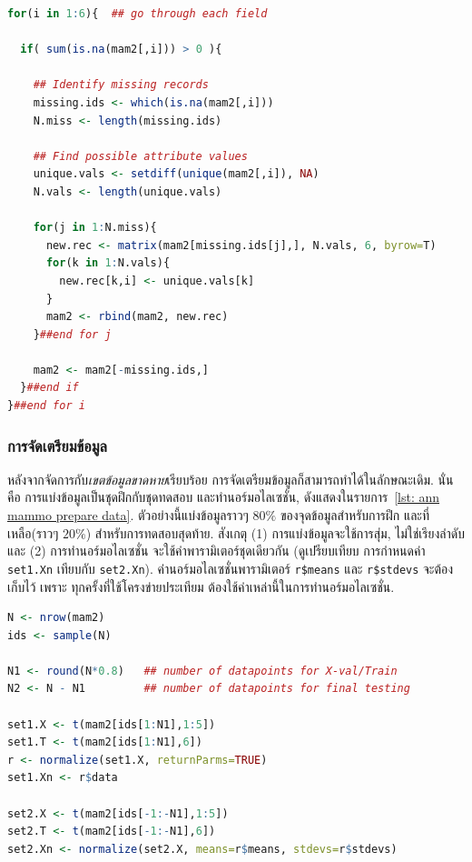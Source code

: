 \begin{lstlisting}[language=R,caption={ตัวอย่างการจัดการกับค่าบางเขตข้อมูลขาดไป ด้วยวิธีแทนทุกค่าที่เป็นไปได้},label={lst: ann mammo deal with missing values}]
for(i in 1:6){  ## go through each field

  if( sum(is.na(mam2[,i])) > 0 ){

    ## Identify missing records
    missing.ids <- which(is.na(mam2[,i]))
    N.miss <- length(missing.ids)

    ## Find possible attribute values
    unique.vals <- setdiff(unique(mam2[,i]), NA)
    N.vals <- length(unique.vals)

    for(j in 1:N.miss){
      new.rec <- matrix(mam2[missing.ids[j],], N.vals, 6, byrow=T)
      for(k in 1:N.vals){
        new.rec[k,i] <- unique.vals[k]
      }
      mam2 <- rbind(mam2, new.rec)
    }##end for j

    mam2 <- mam2[-missing.ids,]
  }##end if
}##end for i
\end{lstlisting}

\subsubsection{การจัดเตรียมข้อมูล}

หลังจากจัดการกับ\textit{เขตข้อมูลขาดหาย}เรียบร้อย 
การจัดเตรียมข้อมูลก็สามารถทำได้ในลักษณะเดิม.
นั่นคือ การแบ่งข้อมูลเป็นชุดฝึกกับชุดทดสอบ
และทำนอร์มอไลเซชั่น, ดังแสดงในรายการ~\ref{lst: ann mammo prepare data}.
ตัวอย่างนี้แบ่งข้อมูลราวๆ $80\%$ ของจุดข้อมูลสำหรับการฝึก 
และที่เหลือ(ราวๆ $20\%$) สำหรับการทดสอบสุดท้าย.
สังเกตุ (1) การแบ่งข้อมูลจะใช้การสุ่ม, ไม่ใช่เรียงลำดับ
และ (2) การทำนอร์มอไลเซชั่น จะใช้ค่าพารามิเตอร์ชุดเดียวกัน (ดูเปรียบเทียบ การกำหนดค่า \texttt{set1.Xn} เทียบกับ \texttt{set2.Xn}).
ค่านอร์มอไลเซชั่นพารามิเตอร์ \texttt{r\$means} และ \texttt{r\$stdevs} จะต้องเก็บไว้ 
เพราะ ทุกครั้งที่ใช้โครงข่ายประเทียม ต้องใช้ค่าเหล่านี้ในการทำนอร์มอไลเซชั่น.

\begin{lstlisting}[language=R,caption={ตัวอย่างการจัดเตรียมข้อมูล Mammographic Mass},label={lst: ann mammo prepare data}]
N <- nrow(mam2)
ids <- sample(N)

N1 <- round(N*0.8)   ## number of datapoints for X-val/Train
N2 <- N - N1         ## number of datapoints for final testing

set1.X <- t(mam2[ids[1:N1],1:5])
set1.T <- t(mam2[ids[1:N1],6])
r <- normalize(set1.X, returnParms=TRUE)
set1.Xn <- r$data

set2.X <- t(mam2[ids[-1:-N1],1:5])
set2.T <- t(mam2[ids[-1:-N1],6])
set2.Xn <- normalize(set2.X, means=r$means, stdevs=r$stdevs)
\end{lstlisting}

